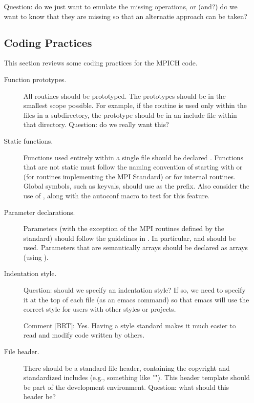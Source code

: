 \documentclass{article}
\begin{document}
Question: do we just want to emulate the missing operations, or (and?)
do we want to know that they are missing so that an alternatie
approach can be taken?

\subsection{Coding Practices}
\label{sec:coding-practices}
This section reviews some coding practices for the MPICH code.

\begin{description}
\item[Function prototypes.]
All routines should be prototyped.  The prototypes should be in the
smallest scope possible.  For example, if the routine is used only
within the files in a subdirectory, the prototype should be in an
include file within that directory.
Question: do we really want this?

\item[Static functions.]
Functions used entirely within a single file should be declared
.  Functions that are not static must follow the naming
convention of starting with  or  (for routines
implementing the MPI Standard) or  for internal routines.  
Global symbols, such as keyvals, should use  as the
prefix.  Also consider the use of , along with the
autoconf macro to test for this feature.

\item[Parameter declarations.]
Parameters (with the exception of the MPI routines defined by the
standard) should follow the guidelines in .  In
particular,  and  should be used.
Parameters that are semantically arrays should be declared as arrays
(using \code{[]}).  

\item[Indentation style.]
Question: should we specify an indentation style?  If so, we need to
specify it at the top of each file (as an emacs command) so that emacs
will use the correct style for users with other styles or projects.

Comment [BRT]: Yes.  Having a style standard makes it much easier to
read and modify code written by others.

\item[File header.]
There should be a standard file header, containing the copyright and
standardized includes (e.g., something like "").  This header
template should be part of the development environment.  Question:
what should this header be?


\end{description}
\end{document}
